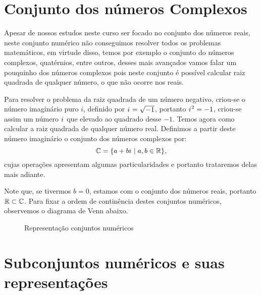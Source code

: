 \section{Conjunto dos números Complexos}

Apesar de nossos estudos neste curso ser focado no conjunto dos números reais, neste conjunto numérico não conseguimos resolver todos os problemas matemáticos, em virtude disso, temos por exemplo o conjunto do números complexos, quatérnios, entre outros, desses mais avançados vamos falar um pouquinho dos números complexos pois neste conjunto é possível calcular raiz quadrada de qualquer número, o que não ocorre nos reais.

Para resolver o problema da raiz quadrada de um número negativo, criou-se o número imaginário puro $i$, definido por ${i\mkern1mu}= \sqrt{-1}$, portanto ${i\mkern1mu}^2= -1$, criou-se assim um número ${i\mkern1mu}$ que elevado ao quadrado desse $-1$. Temos agora como calcular a raiz quadrada de qualquer número real. Definimos a partir deste número imaginário o conjunto dos números complexos por:
\begin{equation*}
\mathbb{C}= \{a + b{i\mkern1mu} \mid a, b \in \mathbb{R} \} ,
\end{equation*}
cujas operações apresentam algumas particularidades e portanto trataremos delas mais adiante.

Note que, se tivermos $b=0$, estamos com o conjunto dos números reais, portanto $\mathbb{R} \subset \mathbb{C}$. Para fixar a ordem de continência destes conjuntos numéricos, observemos o diagrama de Venn abaixo.

 \begin{figure}[H]
    \centering
    \caption{Representação conjuntos numéricos}
  \end{figure}

\section{Subconjuntos numéricos e suas representações}

